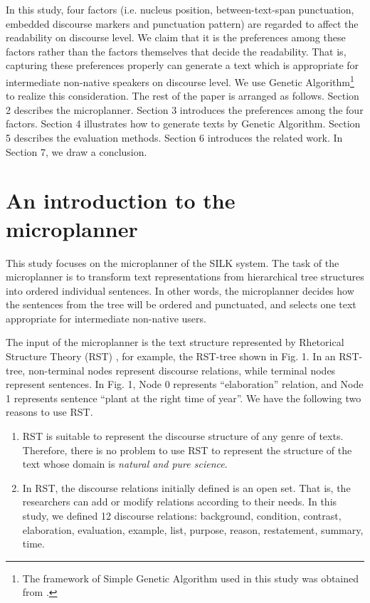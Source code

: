 \documentclass[english]{jnlp_1.2.0}
\begin{document}
In this study, four factors (i.e. nucleus position, 
between-text-span punctuation, embedded discourse markers 
and punctuation pattern) are regarded to affect the 
readability on discourse level. We claim that it is the preferences 
among these factors rather than the factors themselves that decide 
the readability. That is, capturing these preferences properly can 
generate a text which is appropriate for intermediate non-native 
speakers on discourse level. We use Genetic Algorithm\footnote{The framework of Simple Genetic Algorithm used in this study was obtained from \cite{Hirano03}.} to realize 
this consideration. The rest of the paper is arranged as follows. 
Section 2 describes the microplanner. Section 3 introduces the 
preferences among the four factors. Section 4 illustrates how to 
generate texts by Genetic Algorithm. Section 5 describes the 
evaluation methods. Section 6 introduces the related work. In 
Section 7, we draw a conclusion. 


\section{An introduction to the microplanner}

This study focuses on the microplanner of the SILK system. The 
task of the microplanner is to transform text representations from 
hierarchical tree structures into ordered individual sentences. 
In other words, the microplanner decides how the sentences from the 
tree will be ordered and punctuated, and selects one text appropriate 
for intermediate non-native users. 

The input of the microplanner is the text structure represented by 
Rhetorical Structure Theory (RST) \cite{Mann88}, 
for example, the RST-tree shown in Fig. 1. In an RST-tree, 
non-terminal nodes represent discourse relations, while 
terminal nodes represent sentences. In Fig. 1, Node 0 
represents ``elaboration'' relation, and Node 1 represents sentence 
``plant at the right time of year''. We have the following two reasons 
to use RST.

\begin{enumerate}
  \item RST is suitable to represent the discourse structure of any genre of texts.
Therefore, there is no problem to use RST to represent the structure of the text 
whose domain is \textit{natural and pure science}.
  \item In RST, the discourse relations initially defined is an open set.
That is, the researchers can add or modify relations according to their 
needs. In this study, we defined 12 discourse relations: background, condition, contrast, 
elaboration, evaluation, example, list, purpose, reason, restatement, summary, time.
\end{enumerate}
\end{document}
